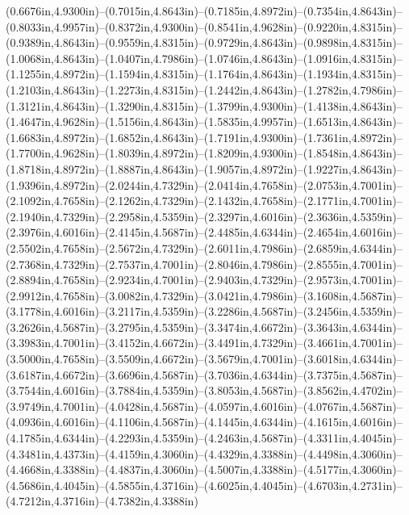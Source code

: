 (0.6676in,4.9300in)--(0.7015in,4.8643in)--(0.7185in,4.8972in)--(0.7354in,4.8643in)--(0.8033in,4.9957in)--(0.8372in,4.9300in)--(0.8541in,4.9628in)--(0.9220in,4.8315in)--(0.9389in,4.8643in)--(0.9559in,4.8315in)--(0.9729in,4.8643in)--(0.9898in,4.8315in)--(1.0068in,4.8643in)--(1.0407in,4.7986in)--(1.0746in,4.8643in)--(1.0916in,4.8315in)--(1.1255in,4.8972in)--(1.1594in,4.8315in)--(1.1764in,4.8643in)--(1.1934in,4.8315in)--(1.2103in,4.8643in)--(1.2273in,4.8315in)--(1.2442in,4.8643in)--(1.2782in,4.7986in)--(1.3121in,4.8643in)--(1.3290in,4.8315in)--(1.3799in,4.9300in)--(1.4138in,4.8643in)--(1.4647in,4.9628in)--(1.5156in,4.8643in)--(1.5835in,4.9957in)--(1.6513in,4.8643in)--(1.6683in,4.8972in)--(1.6852in,4.8643in)--(1.7191in,4.9300in)--(1.7361in,4.8972in)--(1.7700in,4.9628in)--(1.8039in,4.8972in)--(1.8209in,4.9300in)--(1.8548in,4.8643in)--(1.8718in,4.8972in)--(1.8887in,4.8643in)--(1.9057in,4.8972in)--(1.9227in,4.8643in)--(1.9396in,4.8972in)--(2.0244in,4.7329in)--(2.0414in,4.7658in)--(2.0753in,4.7001in)--(2.1092in,4.7658in)--(2.1262in,4.7329in)--(2.1432in,4.7658in)--(2.1771in,4.7001in)--(2.1940in,4.7329in)--(2.2958in,4.5359in)--(2.3297in,4.6016in)--(2.3636in,4.5359in)--(2.3976in,4.6016in)--(2.4145in,4.5687in)--(2.4485in,4.6344in)--(2.4654in,4.6016in)--(2.5502in,4.7658in)--(2.5672in,4.7329in)--(2.6011in,4.7986in)--(2.6859in,4.6344in)--(2.7368in,4.7329in)--(2.7537in,4.7001in)--(2.8046in,4.7986in)--(2.8555in,4.7001in)--(2.8894in,4.7658in)--(2.9234in,4.7001in)--(2.9403in,4.7329in)--(2.9573in,4.7001in)--(2.9912in,4.7658in)--(3.0082in,4.7329in)--(3.0421in,4.7986in)--(3.1608in,4.5687in)--(3.1778in,4.6016in)--(3.2117in,4.5359in)--(3.2286in,4.5687in)--(3.2456in,4.5359in)--(3.2626in,4.5687in)--(3.2795in,4.5359in)--(3.3474in,4.6672in)--(3.3643in,4.6344in)--(3.3983in,4.7001in)--(3.4152in,4.6672in)--(3.4491in,4.7329in)--(3.4661in,4.7001in)--(3.5000in,4.7658in)--(3.5509in,4.6672in)--(3.5679in,4.7001in)--(3.6018in,4.6344in)--(3.6187in,4.6672in)--(3.6696in,4.5687in)--(3.7036in,4.6344in)--(3.7375in,4.5687in)--(3.7544in,4.6016in)--(3.7884in,4.5359in)--(3.8053in,4.5687in)--(3.8562in,4.4702in)--(3.9749in,4.7001in)--(4.0428in,4.5687in)--(4.0597in,4.6016in)--(4.0767in,4.5687in)--(4.0936in,4.6016in)--(4.1106in,4.5687in)--(4.1445in,4.6344in)--(4.1615in,4.6016in)--(4.1785in,4.6344in)--(4.2293in,4.5359in)--(4.2463in,4.5687in)--(4.3311in,4.4045in)--(4.3481in,4.4373in)--(4.4159in,4.3060in)--(4.4329in,4.3388in)--(4.4498in,4.3060in)--(4.4668in,4.3388in)--(4.4837in,4.3060in)--(4.5007in,4.3388in)--(4.5177in,4.3060in)--(4.5686in,4.4045in)--(4.5855in,4.3716in)--(4.6025in,4.4045in)--(4.6703in,4.2731in)--(4.7212in,4.3716in)--(4.7382in,4.3388in) 